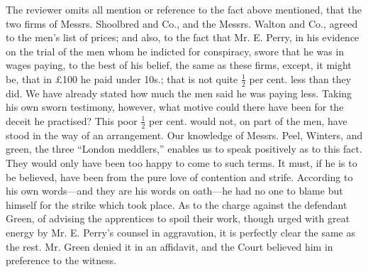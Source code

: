 The reviewer omits all mention or reference to the fact above mentioned,
that the two firms of Messrs. Shoolbred and Co., and the Messrs. Walton
and Co., agreed to the men's list of prices; and also, to the fact that
Mr. E. Perry, in his evidence on the trial of the men whom he indicted
for conspiracy, swore that he was in wages paying, to the best of his
belief, the same as these firms, except, it might be, that in £100 he
paid under 10s.; that is not quite $\frac{1}{2}$ per cent. less than
they did. We have already stated how much the men said he was paying
less. Taking his own sworn testimony, however, what motive could there
have been for the deceit he practised? This poor $\frac{1}{2}$ per cent.
would not, on part of the men, have stood in the way of an arrangement.
Our knowledge of Messrs. Peel, Winters, and green, the three ``London
meddlers,'' enables us to speak positively as to this fact. They would
only have been too happy to come to such terms. It must, if he is to be
believed, have been from the pure love of contention and strife.
According to his own words---and they are his words on oath---he had no
one to blame but himself for the strike which took place. As to the
charge against the defendant Green, of advising the apprentices to spoil
their work, though urged with great energy by Mr. E. Perry's counsel in
aggravation, it is perfectly clear the same as the rest. Mr. Green
denied it in an affidavit, and the Court believed him in preference to
the witness.

